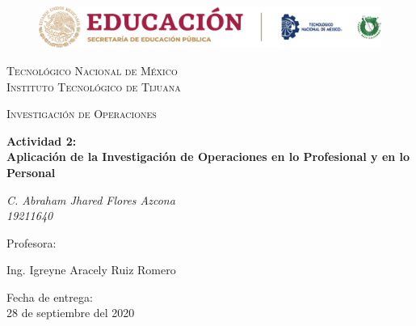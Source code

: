 \documentclass[letterpaper, 12pt]{article}
\begin{document}
    
    \begin{titlepage}
        \begin{figure}[ht]
            \centering
            \includegraphics[width=15cm]{logosITT.png}
        \end{figure}
        \centering
        {\scshape\LARGE Tecnológico Nacional de México\\Instituto Tecnológico de Tijuana\par}
        \vspace{1cm}
        {\scshape\Large Investigación de Operaciones\par}
        \vspace{1.5cm}
        {\huge\bfseries Actividad 2:\\Aplicación de la Investigación de Operaciones en lo Profesional y en lo Personal\par}
        \vspace{2cm}
        {\Large\itshape C. Abraham Jhared Flores Azcona\\19211640\par}
        \vfill
        Profesora: \par
        Ing. Igreyne Aracely Ruiz Romero
    
        \vfill

        {\large Fecha de entrega:\\28 de septiembre del 2020}
    \end{titlepage}

    \newpage
    \thispagestyle{empty}
        \tableofcontents
\end{document}

